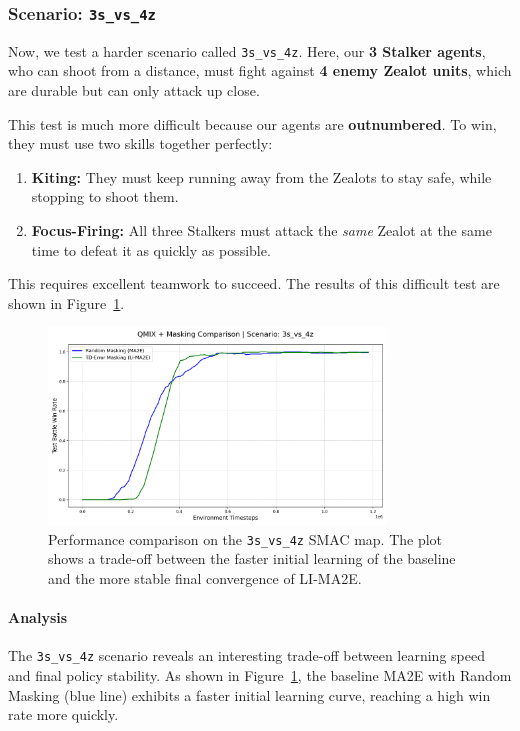 \subsubsection{Scenario: \texttt{3s\_vs\_4z}}

Now, we test a harder scenario called \texttt{3s\_vs\_4z}. Here, our \textbf{3 Stalker agents}, who can shoot from a distance, must fight against \textbf{4 enemy Zealot units}, which are durable but can only attack up close.

This test is much more difficult because our agents are \textbf{outnumbered}. To win, they must use two skills together perfectly:
\begin{enumerate}
    \item \textbf{Kiting:} They must keep running away from the Zealots to stay safe, while stopping to shoot them.
    \item \textbf{Focus-Firing:} All three Stalkers must attack the \textit{same} Zealot at the same time to defeat it as quickly as possible.
\end{enumerate}
This requires excellent teamwork to succeed. The results of this difficult test are shown in Figure~\ref{fig:3s_vs_4z}.

\begin{figure}[H]
    \centering
     \includegraphics[width=0.8\textwidth]{images_pfe/results_li-ma2e/comparison_plot_3s_vs_4z.png}
    \caption{Performance comparison on the \texttt{3s\_vs\_4z} SMAC map. The plot shows a trade-off between the faster initial learning of the baseline and the more stable final convergence of LI-MA2E.}
    \label{fig:3s_vs_4z}
\end{figure}

\paragraph{Analysis}
The \texttt{3s\_vs\_4z} scenario reveals an interesting trade-off between learning speed and final policy stability. As shown in Figure~\ref{fig:3s_vs_4z}, the baseline MA2E with Random Masking (blue line) exhibits a faster initial learning curve, reaching a high win rate more quickly.

